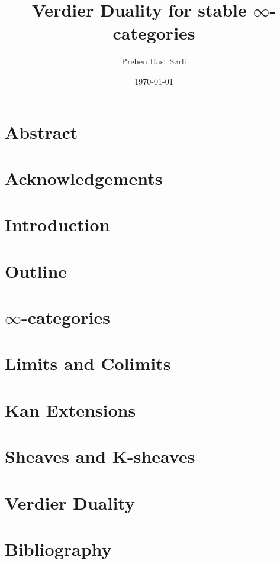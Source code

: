 \documentclass[british,titlepage]{ntnuthesis}
\title{Verdier Duality for stable $\infty$-categories}
\author{Preben Hast Sørli}
\date{\today}
\begin{document}
\chapter*{Abstract}

\chapter*{Acknowledgements}


\chapter*{Introduction}

\chapter*{Outline}

\tableofcontents
%
\chapter{$\infty$-categories}\label{infcatchap}

\chapter{Limits and Colimits}\label{limscolims}



\chapter{Kan Extensions}\label{kanchap}

\chapter{Sheaves and K-sheaves}\label{sheavescap}


\chapter{Verdier Duality}\label{verdiercap}

\chapter*{Bibliography}
\printbibliography[heading=none]
\end{document}
